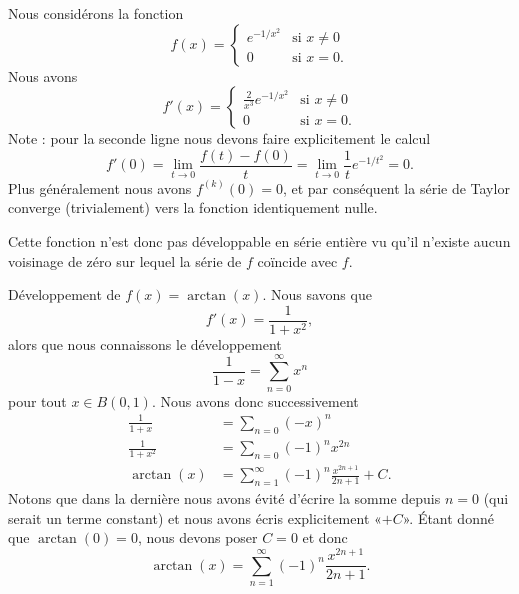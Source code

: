 \begin{example}
	Nous considérons la fonction
	\begin{equation}
		f(x)=\begin{cases}
			e^{-1/x^2} & \text{si } x\neq 0     \\
			0          & \text{si } x=0\text{.}
		\end{cases}
	\end{equation}
	Nous avons
	\begin{equation}
		f'(x)=\begin{cases}
			\frac{ 2 }{ x^3 } e^{-1/x^2} & \text{si } x\neq 0 \\
			0                            & \text{si } x=0.
		\end{cases}
	\end{equation}
	Note : pour la seconde ligne nous devons faire explicitement le calcul
	\begin{equation}
		f'(0)=\lim_{t\to 0} \frac{ f(t)-f(0) }{ t }=\lim_{t\to 0} \frac{1}{ t } e^{-1/t^2}=0.
	\end{equation}
	Plus généralement nous avons \( f^{(k)}(0)=0\), et par conséquent la série de Taylor converge (trivialement) vers la fonction identiquement nulle.

	Cette fonction n'est donc pas développable en série entière vu qu'il n'existe aucun voisinage de zéro sur lequel la série de \( f\) coïncide avec \( f\).
\end{example}

\begin{example}     \label{ExwobBAW}
	Développement de \( f(x)=\arctan(x)\). Nous savons que
	\begin{equation}
		f'(x)=\frac{1}{ 1+x^2 },
	\end{equation}
	alors que nous connaissons le développement
	\begin{equation}    \label{EqVmuaqT}
		\frac{1}{ 1-x }=\sum_{n=0}^{\infty}x^n
	\end{equation}
	pour tout \( x\in B(0,1)\). Nous avons donc successivement
	\begin{subequations}
		\begin{align}
			\frac{1}{ 1+x }     & =\sum_{n=0}(-x)^n                                      \\
			\frac{ 1 }{ 1+x^2 } & =\sum_{n=0}(-1)^nx^{2n}                                \\
			\arctan(x)          & =\sum_{n=1}^{\infty}(-1)^n\frac{ x^{2n+1} }{ 2n+1 }+C.
		\end{align}
	\end{subequations}
	Notons que dans la dernière nous avons évité d'écrire la somme depuis \( n=0\) (qui serait un terme constant) et nous avons écris explicitement «\( +C\)». Étant donné que \( \arctan(0)=0\), nous devons poser \( C=0\) et donc
	\begin{equation}
		\arctan(x)=\sum_{n=1}^{\infty}(-1)^n\frac{ x^{2n+1} }{ 2n+1 }.
	\end{equation}
\end{example}

